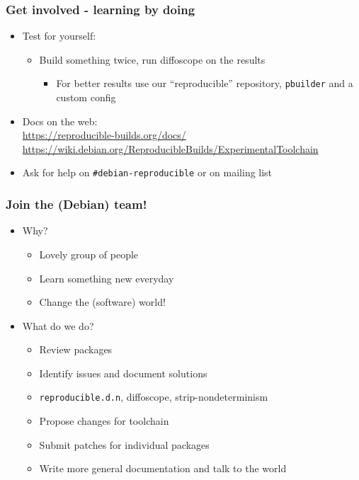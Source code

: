 \documentclass[14pt]{beamer}
\begin{document}
\begin{frame}
 \frametitle{Get involved - learning by doing}

 \begin{itemize}
  \item Test for yourself:
   \begin{itemize}
    \item Build something twice, run diffoscope on the results
    \begin{itemize}
     \item For better results use our “reproducible” repository, \texttt{pbuilder} and a custom config
    \end{itemize}
   \end{itemize}
  \item Docs on the web: \\
    \small{\url{https://reproducible-builds.org/docs/}} \\
    \small{\url{https://wiki.debian.org/ReproducibleBuilds/ExperimentalToolchain}}
  \item Ask for help on \texttt{\#debian-reproducible} or on mailing list
 \end{itemize}
\end{frame}

\begin{frame}
 \frametitle{Join the (Debian) team!}

 \begin{itemize}
  \item Why?
   \begin{itemize}
    \item \heartsuit{}\heartsuit{}\heartsuit{} Lovely group of people \heartsuit{}\heartsuit{}\heartsuit{}
    \item Learn something new everyday
    \item Change the (software) world!
   \end{itemize}
  \item What do we do?
   \begin{itemize}
    \item Review packages
    \item Identify issues and document solutions
    \item \texttt{reproducible.d.n}, diffoscope, strip-nondeterminism
    \item Propose changes for toolchain
    \item Submit patches for individual packages
    \item Write more general documentation and talk to the world
   \end{itemize}
 \end{itemize}
\end{frame}
\end{document}
